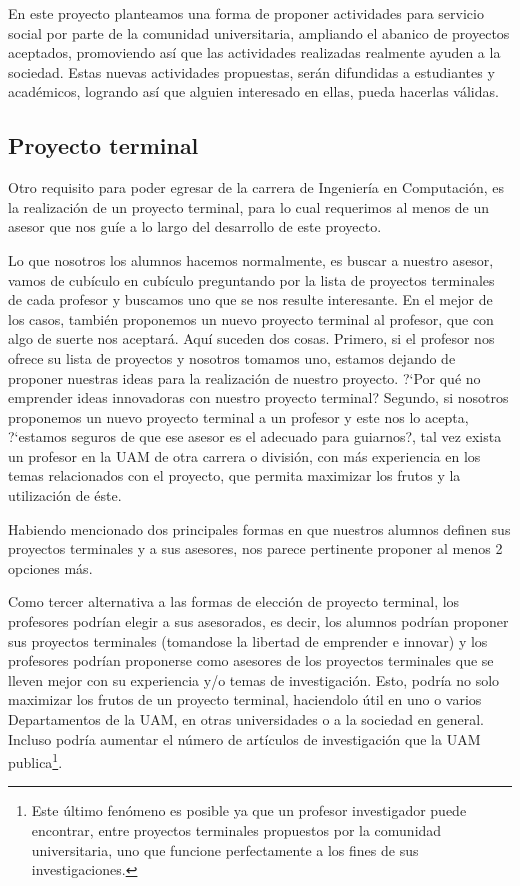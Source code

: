 \documentclass[11pt,letterpaper,titlepage]{article}
\begin{document}
En este proyecto planteamos una forma de proponer actividades para servicio social por parte de la comunidad universitaria, ampliando el abanico de proyectos aceptados, promoviendo as\'i que las actividades realizadas realmente ayuden a la sociedad. Estas nuevas actividades propuestas, ser\'an difundidas a estudiantes y acad\'emicos, logrando as\'i que alguien interesado en ellas, pueda hacerlas v\'alidas.


\subsection{Proyecto terminal}
Otro requisito para poder egresar de la carrera de Ingenier\'ia en Computaci\'on, es la realizaci\'on de un proyecto terminal, para lo cual requerimos al menos de un asesor que nos gu\'ie a lo largo del desarrollo de este proyecto.

Lo que nosotros los alumnos hacemos normalmente, es buscar a nuestro asesor, vamos de cub\'iculo en cub\'iculo preguntando por la lista de proyectos terminales de cada profesor y buscamos uno que se nos resulte interesante. En el mejor de los casos, tambi\'en proponemos un nuevo proyecto terminal al profesor, que con algo de suerte nos aceptar\'a. Aqu\'i suceden dos cosas. Primero, si el profesor nos ofrece su lista de proyectos y nosotros tomamos uno, estamos dejando de proponer nuestras ideas para la realizaci\'on de nuestro proyecto. ?`Por qu\'e no emprender ideas innovadoras con nuestro proyecto terminal? Segundo, si nosotros proponemos un nuevo proyecto terminal a un profesor y este nos lo acepta, ?`estamos seguros de que ese asesor es el adecuado para guiarnos?, tal vez exista un profesor en la UAM de otra carrera o divisi\'on, con m\'as experiencia en los temas relacionados con el proyecto, que permita maximizar los frutos y la utilizaci\'on de \'este.

Habiendo mencionado dos principales formas en que nuestros alumnos definen sus proyectos terminales y a sus asesores, nos parece pertinente proponer al menos 2 opciones m\'as.

Como tercer alternativa a las formas de elecci\'on de proyecto terminal, los profesores podr\'ian elegir a sus asesorados, es decir, los alumnos podr\'ian proponer sus proyectos terminales (tomandose la libertad de emprender e innovar) y los profesores podr\'ian proponerse como asesores de los proyectos terminales que se lleven mejor con su experiencia y/o temas de investigaci\'on. Esto, podr\'ia no solo maximizar los frutos de un proyecto terminal, haciendolo \'util en uno o varios Departamentos de la UAM, en otras universidades o a la sociedad en general. Incluso podr\'ia aumentar el n\'umero de art\'iculos de investigaci\'on que la UAM publica\footnote{Este \'ultimo fen\'omeno es posible ya que un profesor investigador puede encontrar, entre proyectos terminales propuestos por la comunidad universitaria, uno que funcione perfectamente a los fines de sus investigaciones.}.
\end{document}
